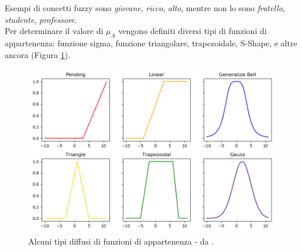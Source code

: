 \documentclass[12pt]{report}
\theoremstyle{definition}
\begin{document}
Esempi di concetti fuzzy sono \textit{giovane}, \textit{ricco}, \textit{alto}, mentre non lo sono \textit{fratello}, \textit{studente}, \textit{professore}.
\\
Per determinare il valore di $\mu_A$ vengono definiti diversi tipi di funzioni di appartenenza: funzione sigma, funzione triangolare, trapezoidale, S-Shape, e altre ancora (Figura \ref{membership_functions}). 
\\
\begin{figure}
    \centering
    \includegraphics[scale = 0.7]{images/membership_functions.png}
    \caption{Alcuni tipi diffusi di funzioni di appartenenza - da \cite{30}.}
    \label{membership_functions}
\end{figure}
\end{document}
